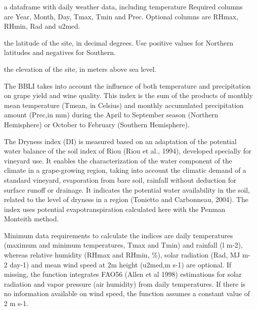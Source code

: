 \documentclass[a4paper]{book}
\begin{document}
%
\begin{Arguments}
\begin{ldescription}
\item[\code{climdata}] a dataframe with daily weather data, including temperature
Required columns are Year, Month, Day, Tmax, Tmin and Prec. Optional columns 
are RHmax, RHmin, Rad and u2med.

\item[\code{lat}] the latitude of the site, in decimal degrees. Use positive values
for Northern latitudes and negatives for Southern.

\item[\code{elev}] the elevation of the site, in meters above sea level.
\end{ldescription}
\end{Arguments}
%
\begin{Details}\relax
The BBLI takes into account  the influence  of  both  
temperature  and  precipitation  on  grape yield  and  wine  quality.  
This  index  is  the  sum of  the products of monthly mean temperature 
(Tmean, in Celsius) and monthly  accumulated  precipitation  amount  (Prec,in mm)
during the April to September season (Northern Hemisphere) or October to 
February (Southern Hemisphere).

The  Dryness  index  (DI)  is  measured  based  on  an adaptation  of  
the  potential  water  balance  of  the  soil index of Riou (Riou et al., 
1994), developed specially for vineyard use. It  enables  the  characterization
of the  water  component  of  the  climate  in  a  grape-growing  region,
taking into account the climatic demand of a standard vineyard, evaporation
from bare soil, rainfall without deduction for surface runoff or drainage. 
It indicates the potential  water  availability  in  the  soil,  related  
to the level of dryness in a region (Tonietto and Carbonneau, 2004). The
index uses potential evapotranspiration calculated here with 
the Penman Monteith method.

Minimum data requirements to calculate the indices are daily temperatures 
(maximum and minimum temperatures, Tmax and Tmin) and rainfall (l m-2), 
whereas relative humidity (RHmax and RHmin, \%), solar radiation 
(Rad, MJ m-2 day-1) and mean wind speed at 2m height (u2med,m s-1) are optional. 
If missing, the function integrates FAO56 (Allen et al 1998) estimations 
for solar radiation and vapor pressure (air humidity) from daily temperatures. 
If there is no information available on wind speed, the function assumes a 
constant value of 2 m s-1.
\end{Details}
\end{document}
